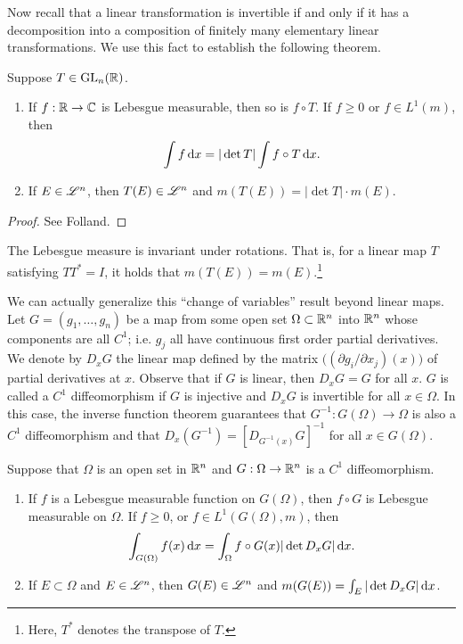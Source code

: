 \documentclass[12pt]{article} %
\begin{document}
Now recall that a linear transformation is invertible if and only if it has a decomposition into a composition of finitely many elementary linear transformations. We use this fact to establish the following theorem.

\begin{theorem}\label{thm:2.44}
    Suppose $T \in \operatorname{GL}_n(\mathbb{R})$. \begin{enumerate}
        \item If $f : \mathbb{R} \to \mathbb{C}$ is Lebesgue measurable, then so is $f \circ T$. If $f \geq 0$ or $f \in L^1(m)$, then \begin{align*}
            \int f \, \mathrm{d} x = |\det T| \int f \circ T \, \mathrm{d} x.
        \end{align*}
        \item If $E \in \mathscr{L}^n$, then $T(E) \in \mathscr{L}^n$ and $m(T(E)) = |\det T| \cdot m(E)$.
    \end{enumerate}
\end{theorem}

\begin{proof}
    See Folland.
\end{proof}

\begin{corollary}
    The Lebesgue measure is invariant under rotations. That is, for a linear map $T$ satisfying $TT^* = I$, it holds that $m(T(E)) = m(E)$.\footnote{Here, $T^*$ denotes the transpose of $T$.}
\end{corollary}

We can actually generalize this ``change of variables'' result beyond linear maps. Let $G = (g_1, \ldots, g_n)$ be a map from some open set $\Omega \subset \mathbb{R}^n$ into $\mathbb{R}^n$ whose components are all $C^1$; i.e. $g_j$ all have continuous first order partial derivatives. We denote by $D_x G$ the linear map defined by the matrix $\Big( (\partial g_i / \partial x_j)(x) \Big)$ of partial derivatives at $x$. Observe that if $G$ is linear, then $D_x G = G$ for all $x$. $G$ is called a $C^1$ diffeomorphism if $G$ is injective and $D_x G$ is invertible for all $x \in \Omega$. In this case, the inverse function theorem guarantees that $G^{-1} : G(\Omega) \to \Omega$ is also a $C^1$ diffeomorphism and that $D_x(G^{-1}) = [D_{G^{-1}(x)}G]^{-1}$ for all $x \in G(\Omega)$.

\begin{theorem}
    Suppose that $\Omega$ is an open set in $\mathbb{R}^n$ and $G : \Omega \to \mathbb{R}^n$ is a $C^1$ diffeomorphism. \begin{enumerate}
        \item If $f$ is a Lebesgue measurable function on $G(\Omega)$, then $f \circ G$ is Lebesgue measurable on $\Omega$. If $f \geq 0$, or $f \in L^1(G(\Omega), m)$, then \[\int_{G(\Omega)} f(x)\, \mathrm{d} x = \int_{\Omega} f \circ G(x) |\det D_x G| \, \mathrm{d} x.\]
        \item If $E \subset \Omega$ and $E \in \mathscr{L}^n$, then $G(E) \in \mathscr{L}^n$ and $m(G(E)) = \int_E |\det D_x G| \, \mathrm{d} x$.
    \end{enumerate}
\end{theorem}
\end{document}
